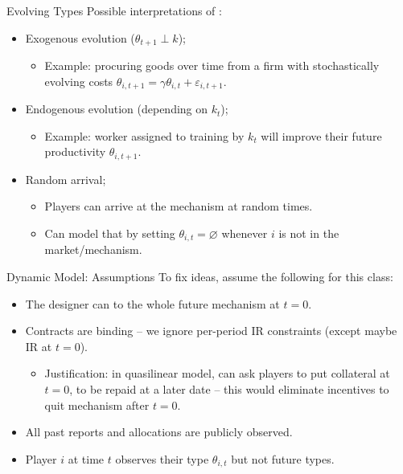 \documentclass[english,10pt
,aspectratio=169
]{beamer}
\begin{document}
\begin{frame}{Evolving Types}
Possible interpretations of :
\begin{itemize}
	\item \alert{Exogenous evolution} ($\theta_{t+1} \perp k$);
	\begin{itemize}
		\item Example: procuring goods over time from a firm with stochastically evolving costs $\theta_{i,t+1} = \gamma \theta_{i,t} + \varepsilon_{i,t+1}$.
	\end{itemize}
	\item \alert{Endogenous evolution} (depending on $k_t$);
	\begin{itemize}
		\item Example: worker assigned to training by $k_t$ will improve their future productivity $\theta_{i,t+1}$.
	\end{itemize}
	\item \alert{Random arrival};
	\begin{itemize}
		\item Players can arrive at the mechanism at random times.
		\item Can model that by setting $\theta_{i,t} = \varnothing$ whenever $i$ is not in the market/mechanism.
	\end{itemize}
\end{itemize}
\end{frame}


\begin{frame}{Dynamic Model: Assumptions}
To fix ideas, assume the following for this class:
\begin{itemize}
	\item The designer can  to the whole future mechanism at $t=0$.
	\item Contracts are binding -- we ignore per-period IR constraints (except maybe IR at $t=0$).
	\begin{itemize}
		\item Justification: in quasilinear model, can ask players to put collateral at $t=0$, to be repaid at a later date -- this would eliminate incentives to quit mechanism after $t=0$.
	\end{itemize}
	\item All past reports and allocations are publicly observed.
	\item Player $i$ at time $t$ observes their type $\theta_{i,t}$ but not future types.
\end{itemize}
\end{frame}
\end{document}
